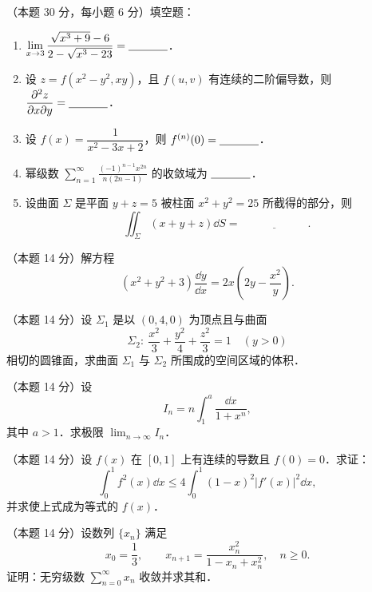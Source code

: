
\begin{problems}
\item[一、]（本题 30 分，每小题 6 分）填空题：
\begin{enumerate}
  \item $\displaystyle \lim_{x\to 3}\frac{\sqrt{x^3+9}-6}{2-\sqrt{x^3-23}}=\underline{\hspace{3.5em}}$．
  \item 设 $z=f(x^2-y^2,xy)$，且 $f(u,v)$ 有连续的二阶偏导数，则 $\displaystyle \frac{\partial^2 z}{\partial x\partial y}=\underline{\hspace{3.5em}}$．
  \item 设 $f(x)=\dfrac{1}{x^2-3x+2}$，则 $f^{(n)}(0)=\underline{\hspace{3.5em}}$．
  \item 幂级数 $\displaystyle \sum_{n=1}^{\infty}\frac{(-1)^{n-1}x^{2n}}{n(2n-1)}$ 的收敛域为 $\underline{\hspace{3.5em}}$．
  \item 设曲面 $\Sigma$ 是平面 $y+z=5$ 被柱面 $x^2+y^2=25$ 所截得的部分，则
  \[
    \iint_{\Sigma}(x+y+z)\dd S=\underline{\hspace{6em}}.
  \]
\end{enumerate}

\item[二、]（本题 14 分）解方程
\[
(x^2+y^2+3)\frac{\dd y}{\dd x}=2x\left(2y-\frac{x^2}{y}\right).
\]

\item[三、]（本题 14 分）设 $\Sigma_1$ 是以 $(0,4,0)$ 为顶点且与曲面
\[
\Sigma_2:\ \frac{x^2}{3}+\frac{y^2}{4}+\frac{z^2}{3}=1\quad (y>0)
\]
相切的圆锥面，求曲面 $\Sigma_1$ 与 $\Sigma_2$ 所围成的空间区域的体积．

\item[四、]（本题 14 分）设
\[
I_n=n\int_1^a\frac{\dd x}{1+x^n},
\]
其中 $a>1$．求极限 $\displaystyle \lim_{n\to\infty}I_n$．

\item[五、]（本题 14 分）设 $f(x)$ 在 $[0,1]$ 上有连续的导数且 $f(0)=0$．求证：
\[
\int_0^1 f^2(x)\dd x\le 4\int_0^1 (1-x)^2|f'(x)|^2\dd x,
\]
并求使上式成为等式的 $f(x)$．

\item[六、]（本题 14 分）设数列 $\{x_n\}$ 满足
\[
x_0=\frac13,\qquad x_{n+1}=\frac{x_n^2}{1-x_n+x_n^2},\quad n\ge 0.
\]
证明：无穷级数 $\displaystyle \sum_{n=0}^{\infty}x_n$ 收敛并求其和．
\end{problems}
